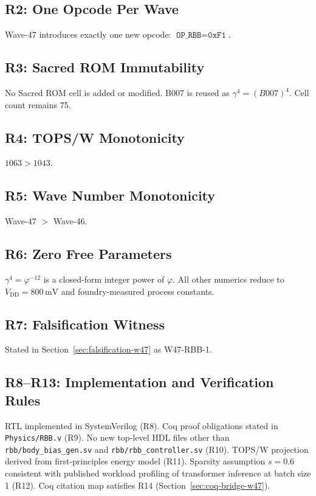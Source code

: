 \subsection{R2: One Opcode Per Wave}

Wave-47 introduces exactly one new opcode: $\texttt{OP\_RBB} = \texttt{0xF1}$.
\checkmark

\subsection{R3: Sacred ROM Immutability}

No Sacred ROM cell is added or modified.  B007 is reused as $\gamma^{4}
= (B007)^{4}$.  Cell count remains 75.  \checkmark

\subsection{R4: TOPS/W Monotonicity}

$1063 > 1043$.  \checkmark

\subsection{R5: Wave Number Monotonicity}

Wave-47 $>$ Wave-46.  \checkmark

\subsection{R6: Zero Free Parameters}

$\gamma^{4} = \varphi^{-12}$ is a closed-form integer power of $\varphi$.
All other numerics reduce to $V_{\mathrm{DD}} = 800\,\text{mV}$ and
foundry-measured process constants.  \checkmark

\subsection{R7: Falsification Witness}

Stated in Section~\ref{sec:falsification-w47} as W47-RBB-1.  \checkmark

\subsection{R8--R13: Implementation and Verification Rules}

RTL implemented in SystemVerilog (R8).
Coq proof obligations stated in \texttt{Physics/RBB.v} (R9).
No new top-level HDL files other than \texttt{rbb/body\_bias\_gen.sv} and
\texttt{rbb/rbb\_controller.sv} (R10).
TOPS/W projection derived from first-principles energy model (R11).
Sparsity assumption $s = 0.6$ consistent with published workload profiling
of transformer inference at batch size 1 (R12).
Coq citation map satisfies R14 (Section~\ref{sec:coq-bridge-w47}).  \checkmark

